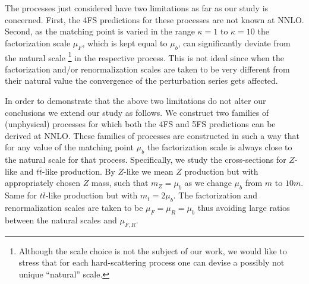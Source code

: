 \documentclass[letter,11pt]{article}
\newcommand{\muF}{\mu_F}
\def\t{{\bar t}}
\def\mub{\mu_b}
\def\k{\kappa}
\begin{document}
The processes just considered have two limitations as far as our study is concerned. First, the 4FS predictions for these processes are not known at NNLO. Second, as the matching point is varied in the range $\k=1$ to $\k=10$ the factorization scale $\muF$, which is kept equal to $\mub$, can significantly deviate from the natural scale 
%
\footnote{Although the scale choice is not the subject of our work, we would like to stress that for each hard-scattering process one can devise a possibly not unique ``natural'' scale.}
%
in the respective process. This is not ideal since when the factorization and/or renormalization scales are taken to be very different from their natural value the convergence of the perturbation series gets affected. 

In order to demonstrate that the above two limitations do not alter our conclusions we extend our study as follows. We construct two families of (unphysical) processes for which both the 4FS and 5FS predictions can be derived at NNLO. These families of processes are constructed in such a way that for any value of the matching point $\mub$ the factorization scale is always close to the natural scale for that process. Specifically, we study the cross-sections for $Z$-like and $t\bar{t}$-like production. By $Z$-like we mean $Z$ production but with appropriately chosen $Z$ mass, such that $m_Z=\mu_b$ as we change $\mub$ from $m$ to $10m$. Same for $t\t$-like production but with $m_t=2\mub$. The factorization and renormalization scales are taken to be $\mu_F=\mu_R=\mub$ thus avoiding large ratios between the natural scales and $\mu_{F,R}$. 
\end{document}
